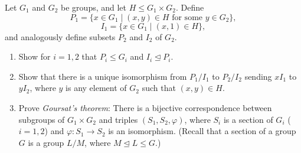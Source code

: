 \documentclass[../Odyssey_Project.tex]{subfiles}
\begin{document}
\begin{exercise}
\label{ex:2.8}
Let $G_1$ and $G_2$ be groups, and let $H \leq G_1 \times G_2$. Define
\[
P_1 = \{x \in G_1 \mid (x,y) \in H \text{ for some } y \in G_2\},
\]
\[
I_1 = \{x \in G_1 \mid (x,1) \in H\},
\]
and analogously define subsets $P_2$ and $I_2$ of $G_2$.
\begin{enumerate}
    \item[(a)] Show for $i = 1,2$ that $P_i \leq G_i$ and $I_i \trianglelefteq P_i$.
    \item[(b)] Show that there is a unique isomorphism from $P_1/I_1$ to $P_2/I_2$ sending $xI_1$ to $yI_2$, where $y$ is any element of $G_2$ such that $(x,y) \in H$.
    \item[(c)] Prove \emph{Goursat's theorem}: There is a bijective correspondence between subgroups of $G_1 \times G_2$ and triples $(S_1, S_2, \varphi)$, where $S_i$ is a section of $G_i$ ($i = 1,2$) and $\varphi : S_1 \to S_2$ is an isomorphism. (Recall that a section of a group $G$ is a group $L/M$, where $M \trianglelefteq L \leq G$.)
\end{enumerate}
\end{exercise}
\end{document}

